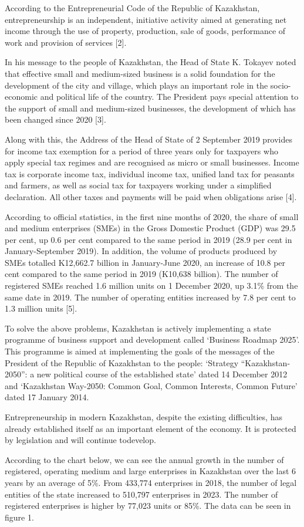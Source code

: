 \begin{multicols}{2}
According to the Entrepreneurial Code of the Republic of Kazakhstan,
entrepreneurship is an independent, initiative activity aimed at
generating net income through the use of property, production, sale of
goods, performance of work and provision of services {[}2{]}.

In his message to the people of Kazakhstan, the Head of State K. Tokayev
noted that effective small and medium-sized business is a solid
foundation for the development of the city and village, which plays an
important role in the socio-economic and political life of the country.
The President pays special attention to the support of small and
medium-sized businesses, the development of which has been changed since
2020 {[}3{]}.

Along with this, the Address of the Head of State of 2 September 2019
provides for income tax exemption for a period of three years only for
taxpayers who apply special tax regimes and are recognised as micro or
small businesses. Income tax is corporate income tax, individual income
tax, unified land tax for peasants and farmers, as well as social tax
for taxpayers working under a simplified declaration. All other taxes
and payments will be paid when obligations arise {[}4{]}.

According to official statistics, in the first nine months of 2020, the
share of small and medium enterprises (SMEs) in the Gross Domestic
Product (GDP) was 29.5 per cent, up 0.6 per cent compared to the same
period in 2019 (28.9 per cent in January-September 2019). In addition,
the volume of products produced by SMEs totalled K12,662.7 billion in
January-June 2020, an increase of 10.8 per cent compared to the same
period in 2019 (K10,638 billion). The number of registered SMEs reached
1.6 million units on 1 December 2020, up 3.1\% from the same date in
2019. The number of operating entities increased by 7.8 per cent to 1.3
million units {[}5{]}.

To solve the above problems, Kazakhstan is actively implementing a state
programme of business support and development called `Business Roadmap
2025'. This programme is aimed at implementing the goals of the messages
of the President of the Republic of Kazakhstan to the people: `Strategy
``Kazakhstan-2050'': a new political course of the established state'
dated 14 December 2012 and `Kazakhstan Way-2050: Common Goal, Common
Interests, Common Future' dated 17 January 2014.

Entrepreneurship in modern Kazakhstan, despite the existing
difficulties, has already established itself as an important element of
the economy. It is protected by legislation and will continue todevelop.

According to the chart below, we can see the annual growth in the number
of registered, operating medium and large enterprises in Kazakhstan over
the last 6 years by an average of 5\%. From 433,774 enterprises in 2018,
the number of legal entities of the state increased to 510,797
enterprises in 2023. The number of registered enterprises is higher by
77,023 units or 85\%. The data can be seen in figure 1.
\end{multicols}

